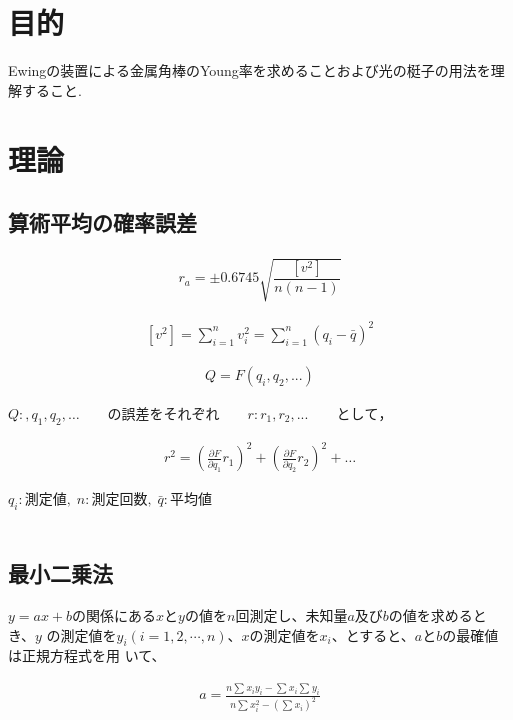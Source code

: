 \documentclass[a4paper,1pt]{jsarticle}
\begin{document}
\section{目的}
Ewingの装置による金属角棒のYoung率を求めることおよび光の梃子の用法を理解すること.\\


\section{理論}

 \subsection*{算術平均の確率誤差}

 \begin{eqnarray}
  \label{kakuritugosa}
  r_a=\pm0.6745\sqrt{\dfrac{[v^2]}{n(n-1)}}
\end{eqnarray}

\begin{eqnarray}
  \label{kaisekizansa}
  [v^2]=\sum_{i=1}^n v_i^2=\sum_{i=1}^n(q_i-\bar{q})^2
\end{eqnarray}

\begin{eqnarray}
  \label{kaisekizansa}
  Q=F(q_i,q_2,...)
\end{eqnarray}


  $Q:,q_1,q_2,\dots\qquad の誤差をそれぞれ\qquad r:r_1,r_2,...\qquad として，$

  \begin{eqnarray}
    \label{kaisekizansa}
    r^2=(\frac{\partial F}{\partial q_1}r_1)^2+(\frac{\partial F}{\partial q_2}r_2)^2+\dots
  \end{eqnarray}


  


  $q_i:測定値,\; n:測定回数,\; \bar{q}:平均値$\\\\

  \subsection*{最小二乗法}
  $y=ax+b$の関係にある$x$と$y$の値を$n$回測定し、未知量$a$及び$b$の値を求めるとき、$y$
      の測定値を$y_i(i=1,2,\cdots,n)$、$x$の測定値を$x_i$、とすると、$a$と$b$の最確値は正規方程式を用
      いて、
     

      \begin{eqnarray}
        \label{kaisekiA}
        a=\frac{n\sum{}^{}x_iy_i-\sum{}^{}x_i \sum{}^{}y_i}{n\sum{}^{}x_i^2-(\sum{}^{}x_i)^2}
      \end{eqnarray}
\end{document}

